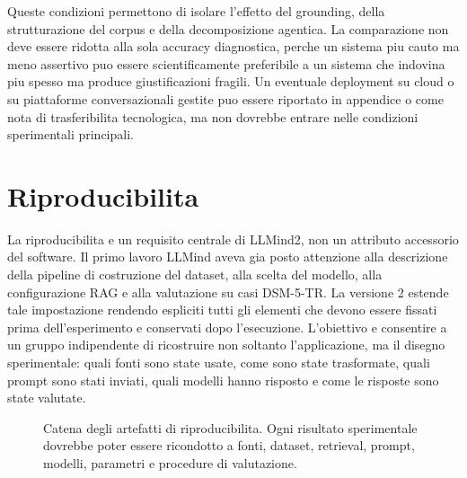 \documentclass[11pt,a4paper]{article}
\newcommand{\llmind}{LLMind2}
\begin{document}
Queste condizioni permettono di isolare l'effetto del grounding, della strutturazione del corpus e della decomposizione agentica. La comparazione non deve essere ridotta alla sola accuracy diagnostica, perche un sistema piu cauto ma meno assertivo puo essere scientificamente preferibile a un sistema che indovina piu spesso ma produce giustificazioni fragili. Un eventuale deployment su cloud o su piattaforme conversazionali gestite puo essere riportato in appendice o come nota di trasferibilita tecnologica, ma non dovrebbe entrare nelle condizioni sperimentali principali.

\section{Riproducibilita}
La riproducibilita e un requisito centrale di \llmind, non un attributo accessorio del software. Il primo lavoro LLMind aveva gia posto attenzione alla descrizione della pipeline di costruzione del dataset, alla scelta del modello, alla configurazione RAG e alla valutazione su casi DSM-5-TR. La versione 2 estende tale impostazione rendendo espliciti tutti gli elementi che devono essere fissati prima dell'esperimento e conservati dopo l'esecuzione. L'obiettivo e consentire a un gruppo indipendente di ricostruire non soltanto l'applicazione, ma il disegno sperimentale: quali fonti sono state usate, come sono state trasformate, quali prompt sono stati inviati, quali modelli hanno risposto e come le risposte sono state valutate.

\begin{figure}[htbp]
\centering
{}
\caption{Catena degli artefatti di riproducibilita. Ogni risultato sperimentale dovrebbe poter essere ricondotto a fonti, dataset, retrieval, prompt, modelli, parametri e procedure di valutazione.}
\label{fig:reproducibility-it}
\end{figure}
\end{document}
